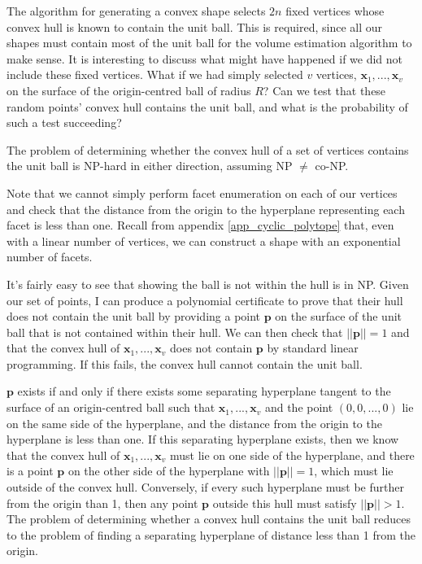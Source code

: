 The algorithm for generating a convex shape selects $2n$ fixed vertices whose convex hull is known to contain the unit ball. This is required, since all our shapes must contain most of the unit ball for the volume estimation algorithm to make sense. It is interesting to discuss what might have happened if we did not include these fixed vertices. What if we had simply selected $v$ vertices, ${\bm x}_1, ..., {\bm x}_v$ on the surface of the origin-centred ball of radius $R$? Can we test that these random points' convex hull contains the unit ball, and what is the probability of such a test succeeding?

\begin{proposition}
The problem of determining whether the convex hull of a set of vertices contains the unit ball is NP-hard in either direction, assuming NP $\neq$ co-NP.
\end{proposition}

Note that we cannot simply perform facet enumeration on each of our vertices and check that the distance from the origin to the hyperplane representing each facet is less than one. Recall from appendix \ref{app_cyclic_polytope} that, even with a linear number of vertices, we can construct a shape with an exponential number of facets.

It's fairly easy to see that showing the ball is not within the hull is in NP. Given our set of points, I can produce a polynomial certificate to prove that their hull does not contain the unit ball by providing a point $\bm p$ on the surface of the unit ball that is not contained within their hull. We can then check that $||\bm{p}|| = 1$ and that the convex hull of ${\bm x}_1, ..., {\bm x}_v$ does not contain $\bm p$ by standard linear programming. If this fails, the convex hull cannot contain the unit ball.

$\bm p$ exists if and only if there exists some separating hyperplane tangent to the surface of an origin-centred ball such that ${\bm x}_1, ..., {\bm x}_v$ and the point $(0,0,...,0)$ lie on the same side of the hyperplane, and the distance from the origin to the hyperplane is less than one. If this separating hyperplane exists, then we know that the convex hull of ${\bm x}_1, ..., {\bm x}_v$ must lie on  one side of the hyperplane, and there is a point $\bm p$ on the other side of the hyperplane with $||\bm {p}|| = 1$, which must lie outside of the convex hull. Conversely, if every such hyperplane must be further from the origin than 1, then any point $\bm p$ outside this hull must satisfy $||\bm{p}||>1$. The problem of determining whether a convex hull contains the unit ball reduces to the problem of finding a separating hyperplane of distance less than 1 from the origin.

